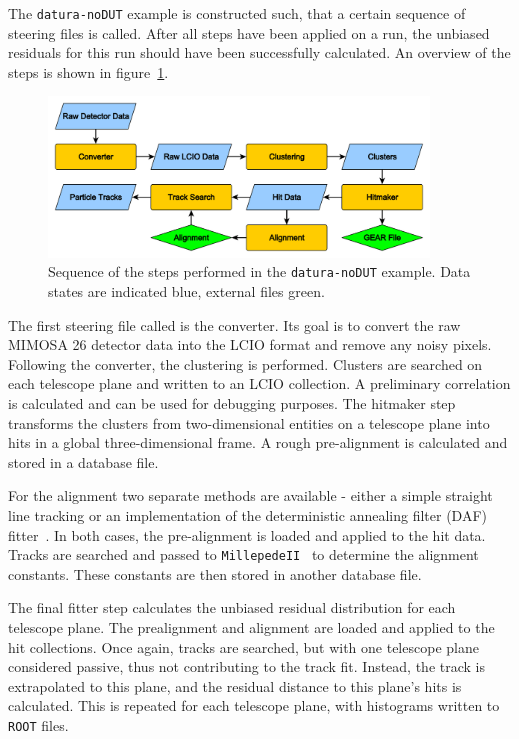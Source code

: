 The \texttt{datura-noDUT} example is constructed such, that a certain sequence of steering files is called.
After all steps have been applied on a run, the unbiased residuals for this run should have been successfully calculated.
An overview of the steps is shown in figure~\ref{fig:datura-nodutsequence}.

\begin{figure}[tbp]
  \centering
  \includegraphics[width=0.9\textwidth]{figures/datura-noDUT_paper}
  \caption[Steps performed in the \texttt{datura-noDUT} example]{Sequence of the steps performed in the \texttt{datura-noDUT} example. 
  Data states are indicated blue, external files green.}
  \label{fig:datura-nodutsequence}
\end{figure}

The first steering file called is the converter.
Its goal is to convert the raw MIMOSA 26 detector data into the LCIO format and remove any noisy pixels.
Following the converter, the clustering is performed.
Clusters are searched on each telescope plane and written to an LCIO collection.
A preliminary correlation is calculated and can be used for debugging purposes.
The hitmaker step transforms the clusters from two-dimensional entities on a telescope plane into hits in a global three-dimensional frame.
A rough pre-alignment is calculated and stored in a database file.

For the alignment two separate methods are available - either a simple straight line tracking or an implementation of the deterministic annealing filter (DAF) fitter~\cite{ref:daffitter}.
In both cases, the pre-alignment is loaded and applied to the hit data.
Tracks are searched and passed to \texttt{MillepedeII}~\cite{Blobel-2006} to determine the alignment constants.
These constants are then stored in another database file.

The final fitter step calculates the unbiased residual distribution for each telescope plane.
The prealignment and alignment are loaded and applied to the hit collections.
Once again, tracks are searched, but with one telescope plane considered passive, thus not contributing to the track fit.
Instead, the track is extrapolated to this plane, and the residual distance to this plane's hits is calculated.
This is repeated for each telescope plane, with histograms written to \texttt{ROOT} files.


